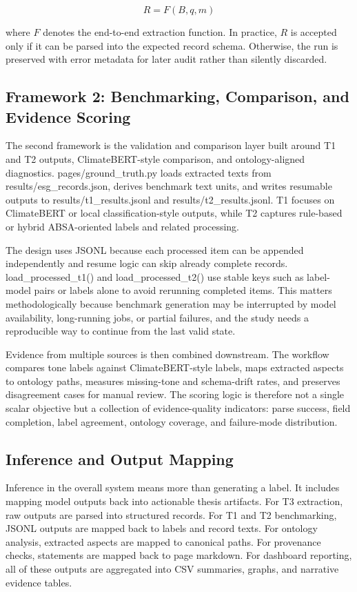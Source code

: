\documentclass[english, online, cse, master]{dithesis}
\begin{document}
\[
R = F(B, q, m)
\]

where \(F\) denotes the end-to-end extraction function. In practice,
\(R\) is accepted only if it can be parsed into the expected record
schema. Otherwise, the run is preserved with error metadata for later
audit rather than silently discarded.

\subsection{Framework 2: Benchmarking, Comparison, and Evidence Scoring}

The second framework is the validation and comparison layer built around T1 and T2 outputs, ClimateBERT-style comparison, and ontology-aligned diagnostics. pages/ground\_truth.py loads extracted texts from results/esg\_records.json, derives benchmark text units, and writes resumable outputs to results/t1\_results.jsonl and results/t2\_results.jsonl. T1 focuses on ClimateBERT or local classification-style outputs, while T2 captures rule-based or hybrid ABSA-oriented labels and related processing.

The design uses JSONL because each processed item can be appended independently and resume logic can skip already complete records. load\_processed\_t1() and load\_processed\_t2() use stable keys such as label-model pairs or labels alone to avoid rerunning completed items. This matters methodologically because benchmark generation may be interrupted by model availability, long-running jobs, or partial failures, and the study needs a reproducible way to continue from the last valid state.

Evidence from multiple sources is then combined downstream. The workflow compares tone labels against ClimateBERT-style labels, maps extracted aspects to ontology paths, measures missing-tone and schema-drift rates, and preserves disagreement cases for manual review. The scoring logic is therefore not a single scalar objective but a collection of evidence-quality indicators: parse success, field completion, label agreement, ontology coverage, and failure-mode distribution.

\subsection{Inference and Output Mapping}

Inference in the overall system means more than generating a label. It includes mapping model outputs back into actionable thesis artifacts. For T3 extraction, raw outputs are parsed into structured records. For T1 and T2 benchmarking, JSONL outputs are mapped back to labels and record texts. For ontology analysis, extracted aspects are mapped to canonical paths. For provenance checks, statements are mapped back to page markdown. For dashboard reporting, all of these outputs are aggregated into CSV summaries, graphs, and narrative evidence tables.
\end{document}
